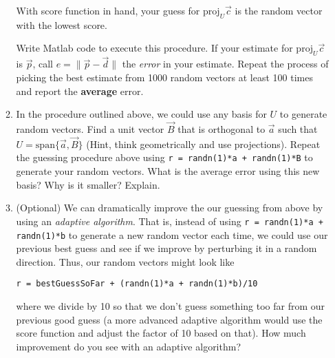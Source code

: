\documentclass[letter]{article}
\newcommand{\Proj}{\mathrm{proj}}
\newcommand{\Span}{\mathrm{span}}
\begin{document}
\begin{enumerate}
\begin{enumerate}
				With score function in hand, your guess for $\Proj_U\vec c$ is the random vector with the lowest score.

				Write Matlab code to execute this procedure.  If your estimate for $\Proj_U\vec c$ is $\vec p$,
				call $e=\|\vec p-\vec d\|$ the \emph{error} in your estimate.  Repeat the process of picking
				the best estimate from 1000 random vectors at least 100 times and report the \textbf{average}
				error.
			\item In the procedure outlined above, we could use any basis for $U$ to generate random 
				vectors.  Find a unit vector $\vec B$ that is orthogonal to $\vec a$
				such that $U=\Span\{\vec a,\vec B\}$ (Hint, think
				geometrically and use projections).  Repeat the guessing procedure above using
				\texttt{r = randn(1)*a + randn(1)*B} to generate your random vectors.  What is the average error
				using this new basis?  Why is it smaller?  Explain.
			\item (Optional) We can dramatically improve the our guessing from above by using an \emph{adaptive algorithm}.
				That is, instead of using \texttt{r = randn(1)*a + randn(1)*b} to generate a new
				random vector each time, we could use our previous best guess and see if we improve by perturbing
				it in a random direction.  Thus, our random vectors might look like \\
				\centerline{\texttt{r = bestGuessSoFar + (randn(1)*a + randn(1)*b)/10}}
				where we divide by 10 so that we don't guess something too far from our previous good guess 
				(a more advanced adaptive algorithm would use the score function and adjust the factor of 10
				based on that).  How much improvement do you see with an adaptive algorithm?
		\end{enumerate}

	\end{enumerate}
\end{document}
